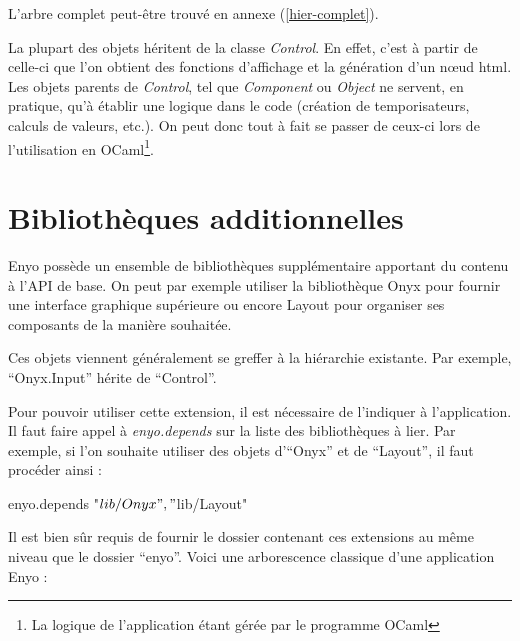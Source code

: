 \documentclass[11pt,a4paper]{report}
\begin{document}
L'arbre complet peut-être trouvé en annexe (\ref{hier-complet}).

La plupart des objets héritent de la classe \emph{Control}. En effet, c'est à partir de celle-ci
que l'on obtient des fonctions d'affichage et la génération d'un n\oe{}ud html.
Les objets parents de \emph{Control}, tel que \emph{Component} ou \emph{Object} ne servent, en pratique,
qu'à établir une logique dans le code (création de temporisateurs, calculs de valeurs, etc.).
On peut donc tout à fait se passer de ceux-ci lors de l'utilisation en OCaml\footnote{La logique de
l'application étant gérée par le programme OCaml}.

\section{Bibliothèques additionnelles}

Enyo possède un ensemble de bibliothèques supplémentaire apportant du contenu à l'API de base.
On peut par exemple utiliser la bibliothèque Onyx pour fournir une interface graphique 
supérieure ou encore Layout pour organiser ses composants de la manière souhaitée.

Ces objets viennent généralement se greffer à la hiérarchie existante. Par exemple,
``Onyx.Input'' hérite de ``Control''.

Pour pouvoir utiliser cette extension, il est nécessaire de l'indiquer à l'application.
Il faut faire appel à \emph{enyo.depends} sur la liste des bibliothèques à lier.
Par exemple, si l'on souhaite utiliser des objets d'``Onyx'' et de ``Layout'', il faut procéder ainsi :

\begin{JavaScript}
  enyo.depends{ "$lib/Onyx", "$lib/Layout"}
\end{JavaScript}

Il est bien sûr requis de fournir le dossier contenant ces extensions au même niveau que le dossier
``enyo''. Voici une arborescence classique d'une application Enyo :

\end{document}
